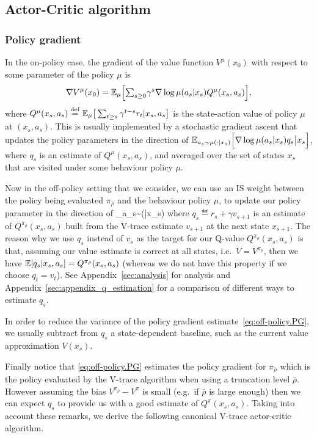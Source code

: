 \subsection{Actor-Critic algorithm}

\subsubsection*{Policy gradient}
In the on-policy case, the gradient of the value function $V^{\mu}(x_0)$ with respect to some parameter of the policy $\mu$ is
$$\nabla V^{\mu}(x_0) = \mathbb{E}_{\mu}\Big[ \textstyle{\sum_{s\geq 0}}\gamma^s \nabla\log\mu(a_s|x_s) Q^{\mu}(x_s, a_s)\Big],$$
where $Q^{\mu}(x_s, a_s)\stackrel{\rm def}{=} \mathbb{E}_{\mu} \big[ \sum_{t\geq s}\gamma^{t-s} r_t |x_s,a_s \big]$ is the state-action value of policy $\mu$ at $(x_s,a_s)$. This is usually implemented by a stochastic gradient ascent that updates the policy parameters in the direction of 
$\mathbb{E}_{a_s\sim \mu(\cdot|x_s)}\Big[ \nabla\log\mu(a_s|x_s) q_s \big| x_s\Big]$, 
where $q_s$ is an estimate of $Q^{\mu}(x_s,a_s)$, and averaged over the set of states $x_s$ that are visited under some behaviour policy $\mu$. 


Now in the off-policy setting that we consider, we can use an IS weight between the policy being evaluated $\pi_{\bar\rho}$ and the behaviour policy $\mu$, to update our policy parameter in the direction of
\beq\label{eq:off-policy.PG}
\E_{a_s\sim \mu(\cdot|x_s)}
\eeq
where $q_s \eqdef r_s + \gamma v_{s+1}$ is an estimate of  $Q^{\pi_{\bar \rho}}(x_s, a_s)$ built from the V-trace estimate $v_{s+1}$ at the next state $x_{s+1}$.
The reason why we use $q_s$ instead of $v_s$ as the target for our Q-value $Q^{\pi_{\bar \rho}}(x_s,a_s)$ is that, assuming our value estimate is correct at all states, i.e.~$V=V^{\pi_{\bar \rho}}$, then we have $\mathbb{E} [q_s|x_s,a_s] = Q^{\pi_{\bar \rho}}(x_{s},a_s)$ (whereas we do not have this property if we choose $q_t = v_t$). See Appendix~\ref{sec:analysis}
for analysis and Appendix~\ref{sec:appendix_q_estimation}
for a comparison of different ways to estimate $q_s$. 


In order to reduce the variance of the policy gradient estimate~\eqref{eq:off-policy.PG}, we usually subtract from $q_s$ a state-dependent baseline, such as the current value approximation $V(x_s)$.

Finally notice that \eqref{eq:off-policy.PG} estimates the policy gradient for $\pi_{\bar \rho}$ which is the policy evaluated by the V-trace algorithm when using a truncation level $\bar \rho$. However assuming the bias $V^{\pi_{\bar\rho}}-V^{\pi}$ is small (e.g.~if $\bar\rho$ is large enough) then we can expect $q_s$ to provide us with a good estimate of $Q^{\pi}(x_s,a_s)$. Taking into account these remarks, we derive the following canonical V-trace actor-critic algorithm.


